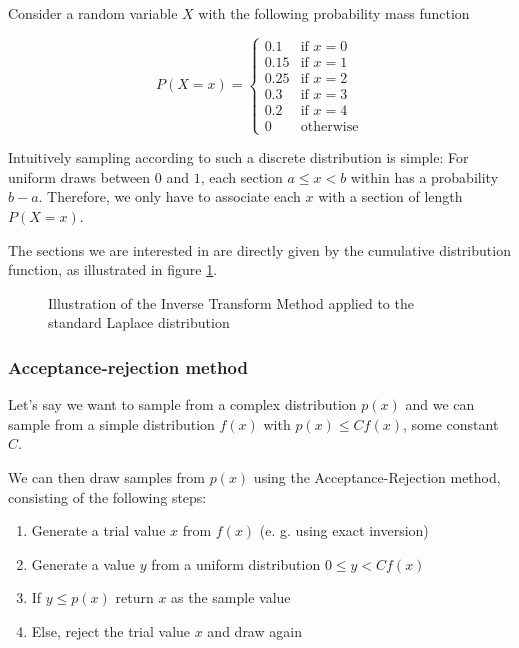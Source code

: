 
Consider a random variable $X$ with the following probability mass function

\begin{equation}
    P(X = x) = \begin{cases}
        0.1 & \text{if } x = 0 \\
        0.15 & \text{if } x = 1 \\
        0.25 & \text{if } x = 2 \\
        0.3 & \text{if } x = 3 \\
        0.2 & \text{if } x = 4 \\
        0 & \text{otherwise}
    \end{cases}
    \label{eq:discrete}
\end{equation}

Intuitively sampling according to such a discrete distribution is simple: 
For uniform draws between $0$ and $1$, each section $a \le x < b$ within has a probability $b - a$.
Therefore, we only have to associate each $x$ with a section of length $P(X = x)$.

The sections we are interested in are directly given by the cumulative distribution function, as illustrated in
figure \ref{fig:discrete_transform}.

\begin{figure}[!htb]
 \centering
 \hfill
 \caption{Illustration of the Inverse Transform Method applied to the standard Laplace distribution}
 \label{fig:discrete_transform}
\end{figure}

\subsubsection{Acceptance-rejection method}
Let's say we want to sample from a complex distribution $p(x)$ and we can sample from a simple distribution $f(x)$ with
$p(x) \leq C f(x)$, some constant $C$.

We can then draw samples from $p(x)$ using the Acceptance-Rejection method, consisting of the following steps:
\begin{enumerate}
    \item Generate a trial value $x$ from $f(x)$ (e. g. using exact inversion)
    \item Generate a value $y$ from a uniform distribution $0\leq y<C f(x)$
    \item If $y\leq p(x)$ return $x$ as the sample value
    \item Else, reject the trial value $x$ and draw again
\end{enumerate}

